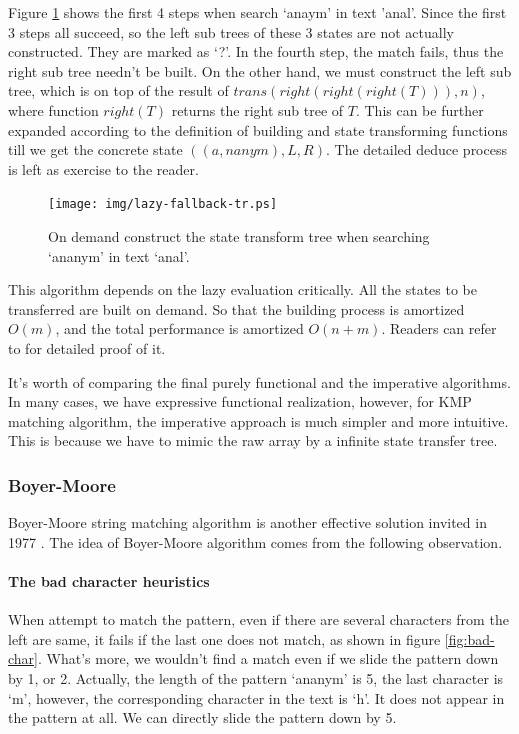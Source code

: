 \documentclass[UTF8]{article}
\begin{document}
Figure \ref{fig:lazy-fallback-tree} shows the first 4 steps when search `anaym' in text 'anal'.
Since the first 3 steps all succeed, so the left sub trees of these 3 states are not actually
constructed. They are marked as `?'. In the fourth step, the match fails, thus the right
sub tree needn't be built. On the other hand, we must construct the left sub tree, which
is on top of the result of $trans(right(right(right(T))), n)$, where function
$right(T)$ returns the right sub tree of $T$. This can be further expanded according to
the definition of building and state transforming functions till we get the concrete state
$((a, nanym), L, R)$. The detailed deduce process is left as exercise to the reader.

\begin{figure}[htbp]
 \centering
 \texttt{[image: img/lazy-fallback-tr.ps]}
 \caption{On demand construct the state transform tree when searching `ananym' in text `anal'.}
 \label{fig:lazy-fallback-tree}
\end{figure}

This algorithm depends on the lazy evaluation critically. All the states to be transferred
are built on demand. So that the building process is amortized $O(m)$, and the total performance is
amortized $O(n + m)$. Readers can refer to \cite{fp-pearls} for detailed proof of it.

It's worth of comparing the final purely functional and the imperative algorithms. In many cases, we
have expressive functional realization, however, for KMP matching algorithm, the imperative approach
is much simpler and more intuitive. This is because we have to mimic the raw array by a infinite state
transfer tree.

\subsubsection{Boyer-Moore}

Boyer-Moore string matching algorithm is another effective solution invited in 1977 \cite{boyer-moore}.
The idea of Boyer-Moore algorithm comes from the following observation.

\paragraph{The bad character heuristics}
When attempt to match the pattern, even if there are several characters from the
left are same, it fails if the last one does not match, as shown in figure \ref{fig:bad-char}. What's more,
we wouldn't find a match even if we slide the pattern down by 1, or 2. Actually, the length of the
pattern `ananym' is 5, the last character is `m', however, the corresponding character in the
text is `h'. It does not appear in the pattern at all. We can directly slide the pattern down by 5.
\end{document}

